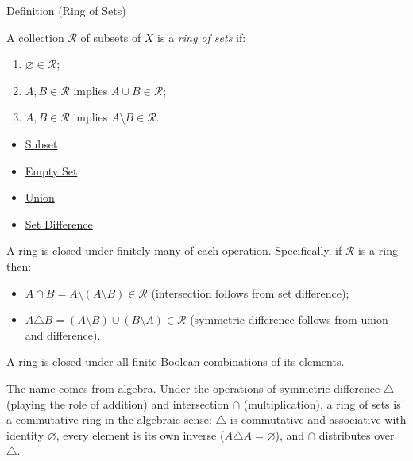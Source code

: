 
\begin{definitionbox}{Definition (Ring of Sets)}
\begin{definition}\label{def:ring-of-setsxxx}
A collection $\mathcal{R}$ of subsets of $X$ is a \emph{ring of sets} if:
\begin{enumerate}[label=(\roman*)]
\item $\varnothing \in \mathcal{R}$;
\item $A, B \in \mathcal{R}$ implies $A \cup B \in \mathcal{R}$;
\item $A, B \in \mathcal{R}$ implies $A \setminus B \in \mathcal{R}$.
\end{enumerate}
\end{definition}
\end{definitionbox}

\begin{dependencies}
\begin{itemize}
  \item \hyperref[def:subset]{Subset}
  \item \hyperref[def:empty-set]{Empty Set}
  \item \hyperref[def:union]{Union}
  \item \hyperref[def:set-difference]{Set Difference}
\end{itemize}
\end{dependencies}

\begin{remark*}
A ring is closed under finitely many of each operation. Specifically, if
$\mathcal{R}$ is a ring then:
\begin{itemize}
\item $A \cap B = A \setminus (A \setminus B) \in \mathcal{R}$ (intersection
  follows from set difference);
\item $A \triangle B = (A \setminus B) \cup (B \setminus A) \in \mathcal{R}$
  (symmetric difference follows from union and difference).
\end{itemize}
A ring is closed under all finite Boolean combinations of its elements.
\end{remark*}

\begin{remark*}
The name comes from algebra. Under the operations of symmetric difference
$\triangle$ (playing the role of addition) and intersection $\cap$
(multiplication), a ring of sets is a commutative ring in the algebraic
sense: $\triangle$ is commutative and associative with identity $\varnothing$,
every element is its own inverse ($A \triangle A = \varnothing$), and $\cap$
distributes over $\triangle$.
\end{remark*}

